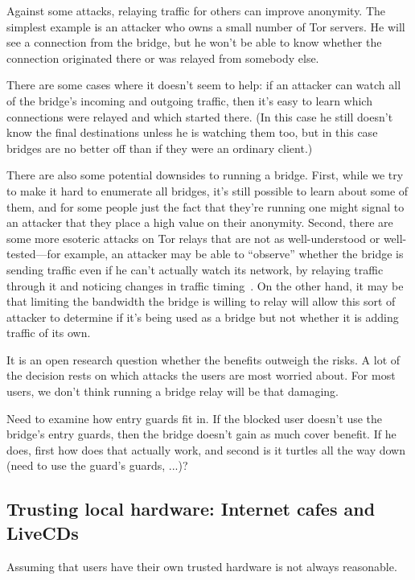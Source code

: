 \documentclass{llncs}
\begin{document}
Against some attacks, relaying traffic for others can improve anonymity. The
simplest example is an attacker who owns a small number of Tor servers. He
will see a connection from the bridge, but he won't be able to know
whether the connection originated there or was relayed from somebody else.

There are some cases where it doesn't seem to help: if an attacker can
watch all of the bridge's incoming and outgoing traffic, then it's easy
to learn which connections were relayed and which started there. (In this
case he still doesn't know the final destinations unless he is watching
them too, but in this case bridges are no better off than if they were
an ordinary client.)

There are also some potential downsides to running a bridge. First, while
we try to make it hard to enumerate all bridges, it's still possible to
learn about some of them, and for some people just the fact that they're
running one might signal to an attacker that they place a high value
on their anonymity. Second, there are some more esoteric attacks on Tor
relays that are not as well-understood or well-tested---for example, an
attacker may be able to ``observe'' whether the bridge is sending traffic
even if he can't actually watch its network, by relaying traffic through
it and noticing changes in traffic timing~\cite{attack-tor-oak05}. On
the other hand, it may be that limiting the bandwidth the bridge is
willing to relay will allow this sort of attacker to determine if it's
being used as a bridge but not whether it is adding traffic of its own.

It is an open research question whether the benefits outweigh the risks. A
lot of the decision rests on which attacks the users are most worried
about. For most users, we don't think running a bridge relay will be
that damaging.

Need to examine how entry guards fit in. If the blocked user doesn't use
the bridge's entry guards, then the bridge doesn't gain as much cover
benefit. If he does, first how does that actually work, and second is
it turtles all the way down (need to use the guard's guards, ...)?

\subsection{Trusting local hardware: Internet cafes and LiveCDs}
\label{subsec:cafes-and-livecds}

Assuming that users have their own trusted hardware is not
always reasonable.
\end{document}
